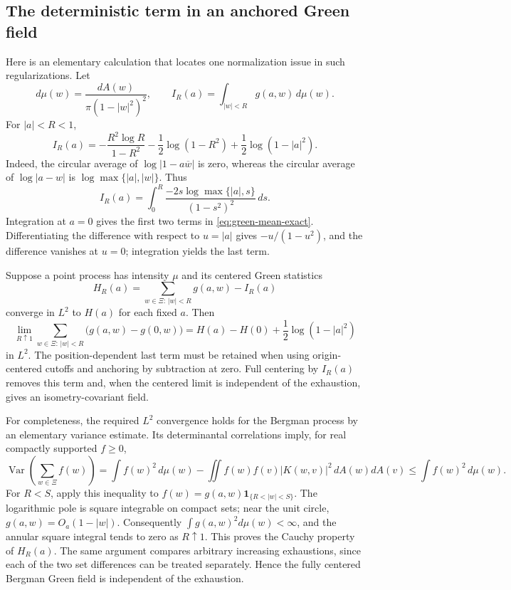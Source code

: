 \documentclass[11pt,a4paper]{article}
\numberwithin{equation}{section}
\theoremstyle{definition}
\theoremstyle{remark}
\DeclareMathOperator{\Var}{Var}
\begin{document}
\subsection{The deterministic term in an anchored Green field}

Here is an elementary calculation that locates one normalization issue
in such regularizations. Let
\[
 d\mu(w)=\frac{dA(w)}{\pi(1-|w|^2)^2},
 \qquad I_R(a)=\int_{|w|<R}g(a,w)\,d\mu(w).
\]
For $|a|<R<1$,
\begin{equation}
 I_R(a)=-\frac{R^2\log R}{1-R^2}
         -\frac12\log(1-R^2)
         +\frac12\log(1-|a|^2).
 \label{eq:green-mean-exact}
\end{equation}
Indeed, the circular average of $\log|1-a\overline w|$ is zero,
whereas the circular average of $\log|a-w|$ is
$\log\max\{|a|,|w|\}$. Thus
\[
 I_R(a)=\int_0^R\frac{-2s\log\max\{|a|,s\}}{(1-s^2)^2}\,ds.
\]
Integration at $a=0$ gives the first two terms in
\eqref{eq:green-mean-exact}. Differentiating the difference with respect
to $u=|a|$ gives $-u/(1-u^2)$, and the difference vanishes at $u=0$;
integration yields the last term.

Suppose a point process has intensity $\mu$ and its centered Green
statistics
\[
 H_R(a)=\sum_{w\in\Xi:\,|w|<R}g(a,w)-I_R(a)
\]
converge in $L^2$ to $H(a)$ for each fixed $a$. Then
\begin{equation}
 \lim_{R\uparrow1}
 \sum_{w\in\Xi:\,|w|<R}\bigl(g(a,w)-g(0,w)\bigr)
 =H(a)-H(0)+\frac12\log(1-|a|^2)
 \label{eq:anchored-green-drift}
\end{equation}
in $L^2$. The position-dependent last term must be retained when using
origin-centered cutoffs and anchoring by subtraction at zero.
Full centering by $I_R(a)$ removes this term and, when the centered
limit is independent of the exhaustion, gives an isometry-covariant
field.

For completeness, the required $L^2$ convergence holds for the
Bergman process by an elementary variance estimate. Its determinantal
correlations imply, for real compactly supported $f\ge0$,
\[
 \Var\left(\sum_{w\in\Xi}f(w)\right)
  =\int f(w)^2\,d\mu(w)
    -\iint f(w)f(v)|K(w,v)|^2\,dA(w)dA(v)
  \le\int f(w)^2\,d\mu(w).
\]
For $R<S$, apply this inequality to
$f(w)=g(a,w)\mathbf1_{\{R<|w|<S\}}$. The logarithmic pole is
square integrable on compact sets; near the unit circle,
$g(a,w)=O_a(1-|w|)$. Consequently
$\int g(a,w)^2d\mu(w)<\infty$, and the annular square integral tends
to zero as $R\uparrow1$. This proves the Cauchy property of $H_R(a)$.
The same argument compares arbitrary increasing exhaustions, since
each of the two set differences can be treated separately. Hence the
fully centered Bergman Green field is independent of the exhaustion.
\end{document}
